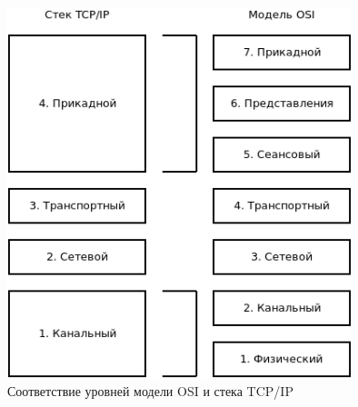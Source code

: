 \documentclass[a4paper]{article}
\begin{document}
\begin{figure}[!h]
	\centering
	\includegraphics[width=10cm]{11-tcpip-vs-osi}
	\caption{Соответствие уровней модели OSI и стека TCP/IP}
	\label{fig:pic-11-tcpip-vs-osi}
\end{figure}
\end{document}
